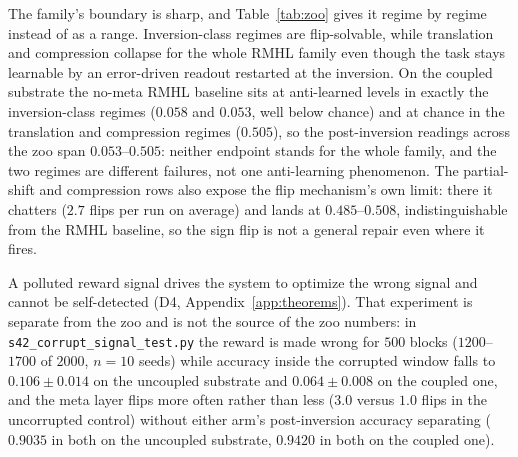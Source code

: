 \documentclass[preprint,12pt]{elsarticle}
\begin{document}
The family's boundary is sharp, and Table~\ref{tab:zoo} gives it regime by
regime instead of as a range. Inversion-class regimes are flip-solvable, while
translation and compression collapse for the whole RMHL family even though the
task stays learnable by an error-driven readout restarted at the inversion. On
the coupled substrate the no-meta RMHL baseline sits at anti-learned levels in
exactly the inversion-class regimes ($0.058$ and $0.053$, well below chance)
and at chance in the translation and compression regimes ($0.505$), so the
post-inversion readings across the zoo span $0.053$--$0.505$: neither endpoint
stands for the whole family, and the two regimes are different failures, not
one anti-learning phenomenon. The partial-shift and compression rows also
expose the flip mechanism's own limit: there it chatters ($2.7$ flips per
run on average) and lands at $0.485$--$0.508$, indistinguishable from the RMHL
baseline, so the sign flip is not a general repair even where it fires.

A polluted reward signal drives the system to optimize the wrong signal and
cannot be self-detected (D4, Appendix~\ref{app:theorems}). That experiment is
separate from the zoo and is not the source of the zoo numbers: in
\texttt{s42\_corrupt\_signal\_test.py} the reward is made wrong for $500$
blocks ($1200$--$1700$ of $2000$, $n=10$ seeds) while accuracy inside the
corrupted window falls to $0.106\pm0.014$ on the uncoupled substrate and
$0.064\pm0.008$ on the coupled one, and the meta layer flips more often rather
than less ($3.0$ versus $1.0$ flips in the uncorrupted control) without either
arm's post-inversion accuracy separating ($0.9035$ in both on the uncoupled
substrate, $0.9420$ in both on the coupled one).
\end{document}
